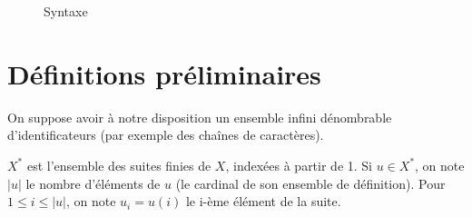 \begin{figure}




  \caption{Syntaxe}
  \label{fig:stx}
\end{figure}

\section{Définitions préliminaires}

On suppose avoir à notre disposition un ensemble infini dénombrable
d'identificateurs \sId (par exemple des chaînes de caractères).

$X^*$ est l'ensemble des suites finies de $X$, indexées à partir de 1. Si $u ∈
X^*$, on note $|u|$ le nombre d'éléments de $u$ (le cardinal de son ensemble de
définition). Pour $1 ≤ i ≤ |u|$, on note $u_i = u(i)$ le i-ème élément de la
suite.

